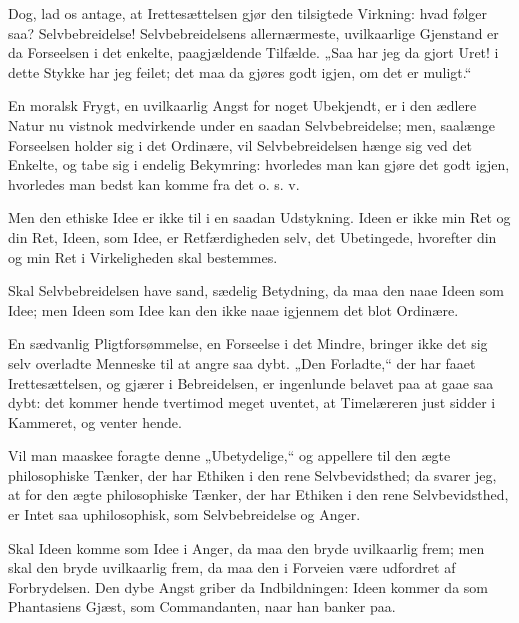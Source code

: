 \documentclass[12pt,a4paper]{book}
\newcommand{\apage}[1]{\marginnote{\footnotesize\textit{[#1]}}}
\begin{document}
Dog, lad os antage, at Irettesættelsen gjør den tilsigtede Virkning:
hvad følger saa? Selvbebreidelse! Selvbebreidelsens allernærmeste,
uvilkaarlige Gjenstand er da Forseelsen i det enkelte, paagjældende
Tilfælde. „Saa har jeg da gjort Uret! i dette Stykke har jeg feilet; det
maa da gjøres godt igjen, om det er muligt.“
 \apage{129}

En moralsk Frygt, en uvilkaarlig Angst for noget Ubekjendt, er i den
ædlere Natur nu vistnok medvirkende under en saadan Selvbebreidelse; men,
saalænge Forseelsen holder sig i det Ordinære, vil Selvbebreidelsen
hænge sig ved det Enkelte, og tabe sig i endelig Bekymring: hvorledes man
kan gjøre det godt igjen, hvorledes man bedst kan komme fra det o. s. v.

Men den ethiske Idee er ikke til i en saadan Udstykning. Ideen er ikke
min Ret og din Ret, Ideen, som Idee, er Retfærdigheden selv, det
Ubetingede, hvorefter din og min Ret i Virkeligheden skal bestemmes.

Skal Selvbebreidelsen have sand, sædelig Betydning, da maa den naae
Ideen som Idee; men Ideen som Idee kan den ikke naae igjennem det blot
Ordinære.

En sædvanlig Pligtforsømmelse, en Forseelse i det Mindre, bringer ikke
det sig selv overladte Menneske til at angre saa dybt. „Den Forladte,“
der har faaet Irettesættelsen, og gjærer i Bebreidelsen, er ingenlunde
belavet paa at gaae saa dybt: det kommer hende tvertimod meget uventet,
at Timelæreren just sidder i Kammeret, og venter hende.

Vil man maaskee foragte denne „Ubetydelige,“ og appellere til den ægte
philosophiske Tænker, der har Ethiken i den rene Selvbevidsthed; da
svarer jeg, at for den ægte philosophiske Tænker, der har Ethiken i den
rene Selvbevidsthed, er Intet saa uphilosophisk, som Selvbebreidelse og
Anger.

Skal Ideen komme som Idee i Anger, da maa den bryde uvilkaarlig frem; men
skal den bryde uvilkaarlig frem, da maa den i Forveien være udfordret af
Forbrydelsen. Den dybe Angst griber da Indbildningen: Ideen kommer da
som Phantasiens Gjæst, som Commandanten, naar han banker paa.
\end{document}
